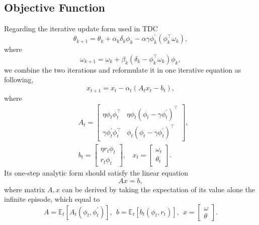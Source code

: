 \documentclass[conference]{IEEEtran}
\begin{document}
\subsection{Objective Function}
Regarding the iterative update form used in TDC \cite{sutton2009fast} 
\begin{equation}
			\theta_{k+1} = \theta_{k}+\alpha_{k}\delta_k\phi_k -\alpha\gamma\phi_{k}^{'}(\phi_k^\top\omega_{k}),
\end{equation}
where
\begin{equation} 
	\omega_{k+1}=\omega_{k}+\beta_{k}(\delta_{k}-\phi_{k}^\top\omega_{k})\phi_k,
\end{equation}
we combine the two iterations and reformulate it in one iterative equation as following,
\begin{equation}
	x_{t+1} = x_t-\alpha_t(A_tx_t-b_t),	
\end{equation}
where
\begin{equation}
\begin{split}
	&A_t = 	\begin{bmatrix} 
				\eta\phi_t\phi_t^\top & \eta\phi_t(\phi_t-\gamma\phi_t^{'})^\top \\ 
				\gamma\phi_t^{'}\phi_t^\top & \phi_t(\phi_t-\gamma\phi_t^{'})^\top 
			\end{bmatrix},\\
	&b_t=\begin{bmatrix}\eta r_t \phi_t \\ r_t\phi_t \end{bmatrix},\ \ \ \  x_t=\begin{bmatrix} \omega_t \\ \theta_t\end{bmatrix}.
\end{split}
\end{equation}
Its one-step analytic form should satisfy the linear equation
\begin{equation}
	Ax = b,
\end{equation}
where matrix $A, x$ can be derived by taking the expectation of its value alone the infinite episode, which equal to
\begin{equation}
	A = \mathbb{E}_t[A_t(\phi_t, \phi_t^{'})],\ \ b = \mathbb{E}_t[b_t(\phi_t, r_t)],\ \ x=\begin{bmatrix} \omega \\ \theta\end{bmatrix}.
\end{equation}
\end{document}
